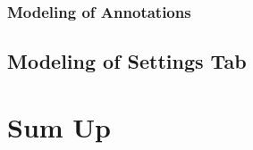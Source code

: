 \subsubsection{Modeling of Annotations}
\subsection{Modeling of Settings Tab}


\section{Sum Up}















